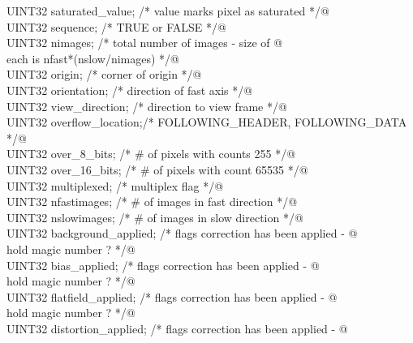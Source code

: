 \documentclass[10pt,a4paper,twoside,notitlepage]{article}
\begin{document}
\begin{flushleft}
\begin{list}{}{}
\mbox{}\verb@         UINT32        saturated_value;  /* value marks pixel as saturated */@\\
\mbox{}\verb@         UINT32        sequence;         /* TRUE or FALSE */@\\
\mbox{}\verb@         UINT32        nimages;          /* total number of images - size of @\\
\mbox{}\verb@                                            each is nfast*(nslow/nimages) */@\\
\mbox{}\verb@         UINT32        origin;           /* corner of origin             */@\\
\mbox{}\verb@         UINT32        orientation;      /* direction of fast axis       */@\\
\mbox{}\verb@         UINT32        view_direction;   /* direction to view frame      */@\\
\mbox{}\verb@         UINT32        overflow_location;/* FOLLOWING_HEADER,  FOLLOWING_DATA */@\\
\mbox{}\verb@         UINT32        over_8_bits;      /* # of pixels with counts  255 */@\\
\mbox{}\verb@         UINT32        over_16_bits;     /* # of pixels with count  65535 */@\\
\mbox{}\verb@         UINT32        multiplexed;      /* multiplex flag */@\\
\mbox{}\verb@         UINT32        nfastimages;      /* # of images in fast direction */@\\
\mbox{}\verb@         UINT32        nslowimages;      /* # of images in slow direction */@\\
\mbox{}\verb@         UINT32        background_applied; /* flags correction has been applied - @\\
\mbox{}\verb@                                              hold magic number ? */@\\
\mbox{}\verb@         UINT32        bias_applied;       /* flags correction has been applied - @\\
\mbox{}\verb@                                              hold magic number ? */@\\
\mbox{}\verb@         UINT32        flatfield_applied;  /* flags correction has been applied - @\\
\mbox{}\verb@                                              hold magic number ? */@\\
\mbox{}\verb@         UINT32        distortion_applied; /* flags correction has been applied - @\\

\end{list}
\end{flushleft}
\end{document}
